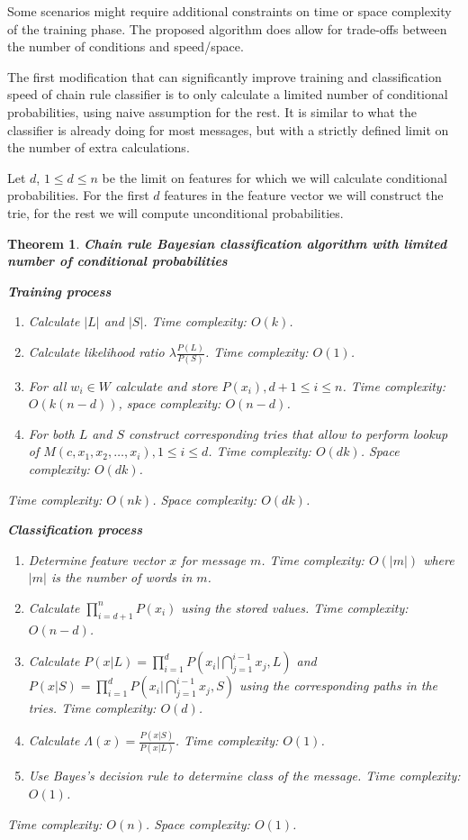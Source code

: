 \documentclass[12pt]{report}
\newtheorem{theorem}{Theorem}[section]
\begin{document}
Some scenarios might require additional constraints on time or space complexity of the training phase. The proposed algorithm does allow for trade-offs between the number of conditions and speed/space.

The first modification that can significantly improve training and classification speed of chain rule classifier is to only calculate a limited number of conditional probabilities, using naive assumption for the rest. It is similar to what the classifier is already doing for most messages, but with a strictly defined limit on the number of extra calculations.

Let $d$, $1 \le d \le n$ be the limit on features for which we will calculate conditional probabilities. For the first $d$ features in the feature vector we will construct the trie, for the rest we will compute unconditional probabilities.

\begin{theorem}
	\textbf{Chain rule Bayesian classification algorithm with limited number of conditional probabilities}
	
	\textbf{Training process}
	
	\begin{enumerate}
		\item Calculate $|L|$ and $|S|$. Time complexity: $O(k)$.
		\item Calculate likelihood ratio $\lambda \frac{P(L)}{P(S)}$. Time complexity: $O(1)$.
		\item For all $w_i \in W$ calculate and store $P(x_i), d+1 \le i \le n$. Time complexity: $O(k(n-d))$, space complexity: $O(n-d)$.
		\item For both $L$ and $S$ construct corresponding tries that allow to perform lookup of $M(c, x_1, x_2, \dots, x_i), 1 \le i \le d$. Time complexity: $O(dk)$. Space complexity: $O(dk)$.
	\end{enumerate}
	
	Time complexity: $O(nk)$. Space complexity: $O(dk)$.
	
	\textbf{Classification process}
	
	\begin{enumerate}
		\item Determine feature vector $x$ for message $m$. Time complexity: $O(|m|)$ where $|m|$ is the number of words in $m$.
		\item Calculate $\prod_{i=d+1}^{n} P(x_i)$ using the stored values. Time complexity: $O(n-d)$.
		\item Calculate $P(x | L) = \prod_{i=1}^{d} P(x_i | \bigcap_{j = 1}^{i - 1} x_j, L)$ and $P(x | S) = \prod_{i=1}^{d} P(x_i | \bigcap_{j = 1}^{i - 1} x_j, S)$ using the corresponding paths in the tries. Time complexity: $O(d)$.
		\item Calculate $\Lambda(x) = \frac{P(x | S)}{P(x | L)}$. Time complexity: $O(1)$.
		\item Use Bayes's decision rule to determine class of the message. Time complexity: $O(1)$.
	\end{enumerate}
	
	Time complexity: $O(n)$. Space complexity: $O(1)$.
\end{theorem}
\end{document}
